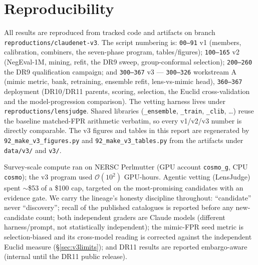 

\section{Reproducibility}
\label{sec:repro}
All results are reproduced from tracked code and artifacts on branch
\texttt{reproductions/claudenet-v3}. The script numbering is: \texttt{00--91} v1 (members, calibration,
combiners, the seven-phase program, tables/figures); \texttt{100--165} v2 (NegEval-1M, mining,
refit, the DR9 sweep, group-conformal selection); \texttt{200--260} the DR9 qualification campaign;
and \texttt{300--367} v3 --- \texttt{300--326} workstream A (mimic metric, bank, retraining,
ensemble refit, lens-vs-mimic head), \texttt{360--367} deployment (DR10/DR11 parents, scoring,
selection, the Euclid cross-validation and the model-progression comparison). The vetting harness
lives under \texttt{reproductions/lensjudge}. Shared libraries (\texttt{\_ensemble},
\texttt{\_train}, \texttt{\_clib}, \ldots) reuse the baseline matched-FPR arithmetic verbatim, so
every v1/v2/v3 number is directly comparable. The v3 figures and tables in this report are
regenerated by \texttt{92\_make\_v3\_figures.py} and \texttt{92\_make\_v3\_tables.py} from the
artifacts under \texttt{data/v3/} and \texttt{v3/}.

Survey-scale compute ran on NERSC Perlmutter (GPU account \texttt{cosmo\_g}, CPU \texttt{cosmo}); the
v3 program used $\mathcal{O}(10^2)$ GPU-hours. Agentic vetting (LensJudge) spent $\sim$\$53 of a \$100
cap, targeted on the most-promising candidates with an evidence gate. We carry the lineage's honesty
discipline throughout: ``candidate'' never ``discovery''; recall of the published catalogues is
reported before any new-candidate count; both independent graders are Claude models (different
harness/prompt, not statistically independent); the mimic-FPR seed metric is selection-biased and
its cross-model reading is corrected against the independent Euclid measure (\S\ref{sec:v3limits});
and DR11 results are reported embargo-aware (internal until the DR11 public release).
